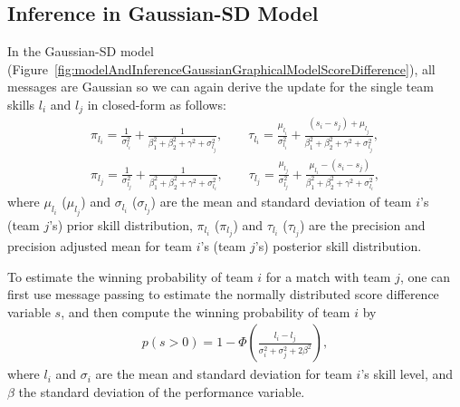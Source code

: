 \subsection{Inference in Gaussian-SD Model}

 In the Gaussian-SD model
(Figure~\ref{fig:modelAndInferenceGaussianGraphicalModelScoreDifference}),
all messages are Gaussian so we can again derive the update
for the single team skills $l_i$ and $l_j$ in closed-form
as follows:
\begin{align}
  \pi_{l_{i}}  =  \frac{1}{\sigma_{l_{i}}^2} + \frac{1}{\beta_1^2+\beta_2^2+\gamma^2+\sigma_{l_{j}}^2}, \qquad  \tau_{l_{i}} =    \frac{\mu_{l_{i}}}{\sigma_{l_{i}}^2} + \frac{(s_i-s_j)+\mu_{l_{j}}}{\beta_1^2+\beta_2^2+\gamma^2+\sigma_{l_{j}}^2},                                      \\
  \pi_{l_{j}}  =    \frac{1}{\sigma_{l_{j}}^2} + \frac{1}{\beta_1^2+\beta_2^2+\gamma^2+\sigma_{l_{i}}^2}, \qquad \tau_{l_{j}} =    \frac{\mu_{l_{j}}}{\sigma_{l_{j}}^2} + \frac{\mu_{l_{i}}-(s_i-s_j)}{\beta_1^2+\beta_2^2+\gamma^2+\sigma_{l_{i}}^2},
  \end{align}
where $\mu_{l_i}$ ($\mu_{l_j}$) and $\sigma_{l_i}$
      ($\sigma_{l_j}$) are the mean and standard deviation of team
      $i$'s (team $j$'s) prior skill distribution,
$\pi_{l_{i}}$ ($\pi_{l_{j}}$) and $\tau_{l_{i}}$
      ($\tau_{l_{j}}$) are the precision and precision adjusted mean
      for team $i$'s (team $j$'s) posterior skill distribution.

 To estimate the winning probability of team $i$ for a match with team $j$, one can first use message passing to estimate the normally distributed score difference variable $s$, and then compute the winning probability of team $i$ by
\begin{align}
  p(s>0) = 1 -
  \Phi\left(\frac{l_i-l_j}{\sigma_i^2+\sigma_j^2+2 \beta^2}\right),
\end{align}
where $l_i$ and $\sigma_i$ are the mean and standard deviation for
team $i$'s skill level, and $\beta$ the standard deviation of the
performance variable.


